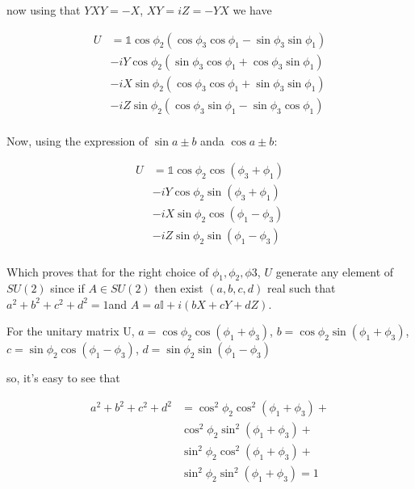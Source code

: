 \documentclass[12pt]{article}
\begin{document}
\begin{flushleft}
now using that  \(YXY = -X\), \(XY = iZ = -YX\) we have

\begin{align*}
    U &= \mathds{1} \cos{\phi_{2}}\left(\cos{\phi_{3}\cos{\phi_{1}}} - \sin{\phi_{3}}\sin{\phi_{1}} \right)  \\
    &-iY\cos{\phi_{2}}\left(\sin{\phi_{3}\cos{\phi_{1}}} + \cos{\phi_{3}}\sin{\phi_{1}} \right) \\
    &-iX \sin{\phi_{2}}\left(\cos{\phi_{3}\cos{\phi_{1}}} + \sin{\phi_{3}}\sin{\phi_{1}} \right)  \\
    &-iZ \sin{\phi_{2}}\left(\cos{\phi_{3}\sin{\phi_{1}}} - \sin{\phi_{3}}\cos{\phi_{1}} \right)  \\
\end{align*}

Now, using the expression of \(\sin{a \pm b}\) anda \(\cos{a \pm b}\):


\begin{align*}
    U &= \mathds{1} \cos{\phi_{2}}\cos{(\phi_{3} + \phi_{1})}  \\
    &-iY\cos{\phi_{2}}\sin{(\phi_{3} + \phi_{1})} \\
    &-iX \sin{\phi_{2}}\cos{(\phi_{1} - \phi_{3})} \\
    &-iZ \sin{\phi_{2}}\sin{(\phi_{1} - \phi_{3})}\\
\end{align*}

Which proves that for the right choice of \( \phi_{1} , \phi_{2}, \phi{3}\), $U$ generate any element of $SU(2)$ since if \(A \in SU(2)\) then exist $(a,b,c,d)$ real such that \(a^2+b^2+c^2+d^2=1\)and \(A = a \mathds{I} + i(bX + cY + dZ)\).

For the unitary matrix U, \(a = \cos{\phi_{2}}\cos{(\phi_{1}+\phi_{3})}\), \(b = \cos{\phi_{2}}\sin{(\phi_{1}+\phi_{3})}\), \(c = \sin{\phi_{2}}\cos{(\phi_{1}-\phi_{3})}\), \(d = \sin{\phi_{2}}\sin{(\phi_{1}-\phi_{3})}\)

so, it's easy to see that

\begin{align*}
    a^2+b^2+c^2+d^2 &= \cos^{2}{\phi_{2}} \cos^{2}{(\phi_{1}+\phi_{3})} +  \\
    &\cos^{2}{\phi_{2}} \sin^{2}{(\phi_{1}+\phi_{3})} + \\
    &\sin^{2}{\phi_{2}} \cos^{2}{(\phi_{1}+\phi_{3})} + \\
    &\sin^{2}{\phi_{2}} \sin^{2}{(\phi_{1}+\phi_{3})}=1\\
\end{align*}


\end{flushleft}
\end{document}
